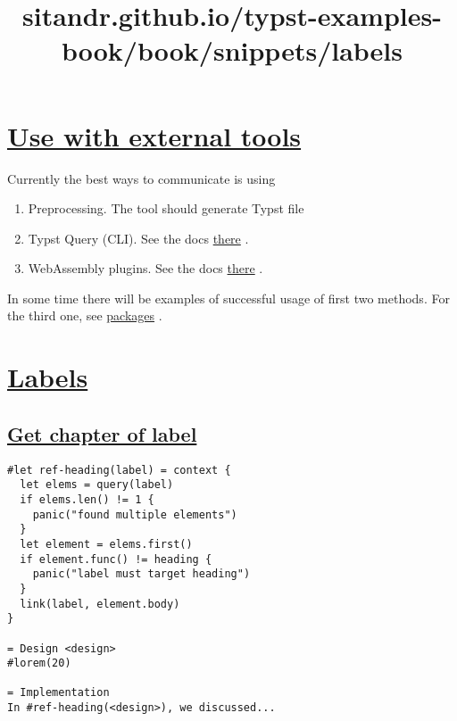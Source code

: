 \section{\texorpdfstring{\hyperref[use-with-external-tools]{Use with
external
tools}}{Use with external tools}}\label{use-with-external-tools}

Currently the best ways to communicate is using

\begin{enumerate}
\tightlist
\item
  Preprocessing. The tool should generate Typst file
\item
  Typst Query (CLI). See the docs
  \href{https://typst.app/docs/reference/meta/query\#command-line-queries}{there}
  .
\item
  WebAssembly plugins. See the docs
  \href{https://typst.app/docs/reference/foundations/plugin/}{there} .
\end{enumerate}

In some time there will be examples of successful usage of first two
methods. For the third one, see \href{../packages/index.html}{packages}
.


\title{sitandr.github.io/typst-examples-book/book/snippets/labels}

\section{\texorpdfstring{\hyperref[labels]{Labels}}{Labels}}\label{labels}

\subsection{\texorpdfstring{\hyperref[get-chapter-of-label]{Get chapter
of label}}{Get chapter of label}}\label{get-chapter-of-label}

\begin{verbatim}
#let ref-heading(label) = context {
  let elems = query(label)
  if elems.len() != 1 {
    panic("found multiple elements")
  }
  let element = elems.first()
  if element.func() != heading {
    panic("label must target heading")
  }
  link(label, element.body)
}

= Design <design>
#lorem(20)

= Implementation
In #ref-heading(<design>), we discussed...
\end{verbatim}

\pandocbounded{}


